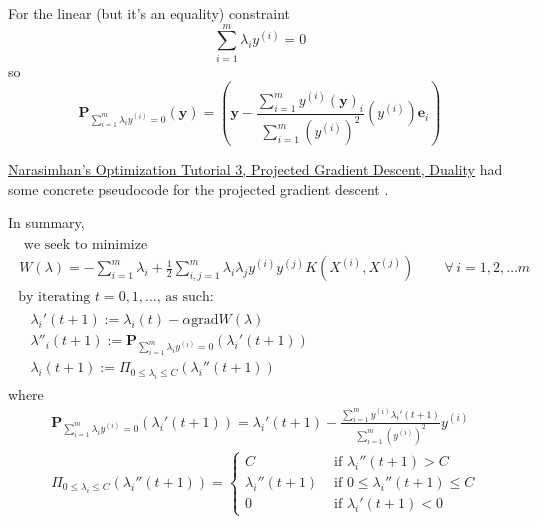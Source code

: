 \documentclass[10pt]{amsart}
\begin{document}
\begin{multicols*}{2}
For the linear (but it's an equality) constraint
\[
\sum_{i=1}^m \lambda_iy^{(i)} = 0 
\]
so
\begin{equation}
  \mathbf{P}_{\sum_{i=1}^m\lambda_iy^{(i)} = 0 }(\mathbf{y}) = \left( \mathbf{y} - \frac{ \sum_{i=1}^m y^{(i)} (\mathbf{y})_i }{ \sum_{i=1}^m (y^{(i)})^2 } (y^{(i)})\mathbf{e}_i \right)
  \end{equation}


\href{http://drona.csa.iisc.ernet.in/~e0270/Jan-2015/Tutorials/lecture-notes-3.pdf}{Narasimhan's Optimization Tutorial 3, Projected Gradient Descent, Duality} had some concrete pseudocode for the projected gradient descent \cite{Nara2015}.

In summary,
\begin{equation}
\begin{gathered}
  \begin{gathered}
    \text{ we seek to minimize } \\
    W(\lambda) = - \sum_{i=1}^m \lambda_i + \frac{1}{2} \sum_{i,j=1}^m \lambda_i \lambda_j y^{(i)} y^{(j)} K(X^{(i)},X^{(j)}) \qquad \, \forall \, i=1,2,\dots m 
  \end{gathered} \\
  \text{  by iterating $t=0,1,\dots $, as such: } \\
  \begin{aligned}
    & \lambda_i'(t+1):=\lambda_i(t) - \alpha \text{grad}{ W(\lambda) } \\ 
    & \lambda''_i(t+1):= \mathbf{P}_{\sum_{i=1}^m \lambda_i y^{(i)} = 0 }( \lambda_i'(t+1)) \\ 
    & \lambda_i(t+1) := \Pi_{0\leq \lambda_i \leq C}(\lambda_i''(t+1))
    \end{aligned}
\end{gathered}
\end{equation}
where
\begin{equation}
\begin{aligned}
& \mathbf{P}_{\sum_{i=1}^m \lambda_i y^{(i)} = 0 }( \lambda_i'(t+1)) = \lambda_i'(t+1) - \frac{ \sum_{i=1}^m y^{(i)}\lambda_i'(t+1) }{ \sum_{i=1}^m (y^{(i)})^2 } y^{(i)} \\ 
  & \Pi_{0\leq \lambda_i \leq C}(\lambda_i''(t+1)) = \begin{cases} C & \text{ if } \lambda_i''(t+1) > C \\
    \lambda_i''(t+1) & \text{ if } 0 \leq \lambda_i''(t+1) \leq C \\
    0 & \text{ if } \lambda_i'(t+1) <0 \end{cases}
\end{aligned}
\end{equation}


\end{multicols*}
\end{document}
